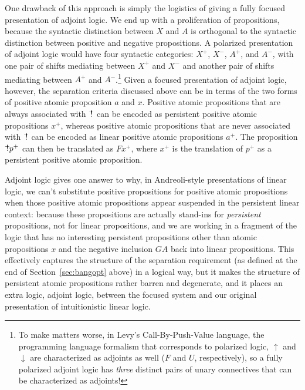 One drawback of this approach is simply the logistics of giving 
a fully focused presentation
of adjoint logic. We end up with a proliferation of propositions,
because the syntactic distinction between $X$ and $A$ is orthogonal to
the syntactic distinction between positive and negative
propositions. A polarized presentation of adjoint logic would have
four syntactic categories: $X^+$, $X^-$, $A^+$, and $A^-$, with one
pair of shifts mediating between $X^+$ and $X^-$ and another pair of
shifts mediating between $A^+$ and $A^-$.\footnote{To make matters
  worse, in Levy's Call-By-Push-Value language, the programming
  language formalism that corresponds to polarized logic, ${\uparrow}$
  and ${\downarrow}$ are characterized as adjoints as well ($F$ and
  $U$, respectively), so a fully polarized adjoint logic has {\it
    three} distinct pairs of unary connectives that can be
  characterized as adjoints!}
Given a focused presentation of adjoint logic, however, 
the separation criteria discussed above can be
in terms of the two forms of positive atomic proposition $a$ and $x$. 
Positive atomic propositions that are always associated with
${\mbox{\hspace{2pt}$\mathbb !$\hspace{-4.965pt}$^+$\hspace{-1pt}}}$ can be encoded as persistent positive atomic
propositions $x^+$, whereas positive atomic propositions that are never
associated with ${\mbox{\hspace{2pt}$\mathbb !$\hspace{-4.965pt}$^+$\hspace{-1pt}}}$ can be encoded as linear positive atomic
propositions $a^+$. The proposition ${\mbox{\hspace{2pt}$\mathbb !$\hspace{-4.965pt}$^+$\hspace{-1pt}}}p^+$ can then be
translated as $F x^+$, where $x^+$ is the translation of $p^+$ as a
persistent positive atomic proposition.

Adjoint logic gives one answer to why, in Andreoli-style
presentations of linear logic, we can't substitute positive
propositions for positive atomic propositions when those positive
atomic propositions appear suspended in the persistent linear context:
because these propositions are actually stand-ins for {\it persistent}
propositions, not for linear propositions, and we are working in a
fragment of the logic that has no interesting persistent propositions
other than atomic propositions $x$ and the negative inclusion $G A$
back into linear propositions.  This effectively captures the
structure of the separation requirement (as defined at the end of
Section~\ref{sec:bangopt} above) in a logical way, but it makes the
structure of persistent atomic propositions rather barren and
degenerate, and it places an extra logic, adjoint logic, between the
focused system and our original presentation of intuitionistic linear
logic.

